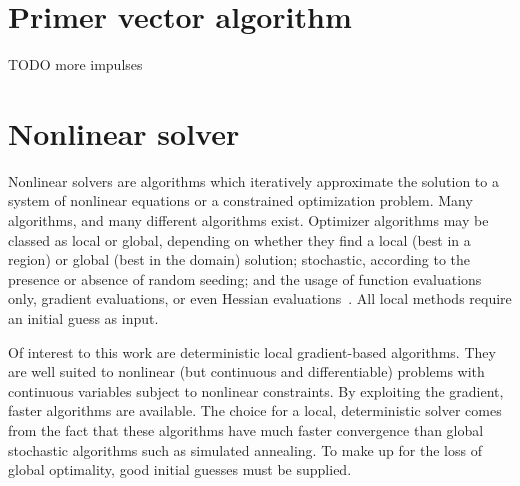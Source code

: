 \section{Primer vector algorithm}



TODO more impulses

\section{Nonlinear solver}

Nonlinear solvers are algorithms which iteratively approximate the solution to a system of nonlinear equations or a constrained optimization problem. Many algorithms, and many different algorithms exist. Optimizer algorithms may be classed as local or global, depending on whether they find a local (best in a region) or global (best in the domain) solution; stochastic, according to the presence or absence of random seeding; and the usage of function evaluations only, gradient evaluations, or even Hessian evaluations~\cite{numerical_recipes}. All local methods require an initial guess as input.

Of interest to this work are deterministic local gradient-based algorithms. They are well suited to nonlinear (but continuous and differentiable) problems with continuous variables subject to nonlinear constraints. By exploiting the gradient, faster algorithms are available. The choice for a local, deterministic solver comes from the fact that these algorithms have much faster convergence than global stochastic algorithms such as simulated annealing. To make up for the loss of global optimality, good initial guesses must be supplied.

